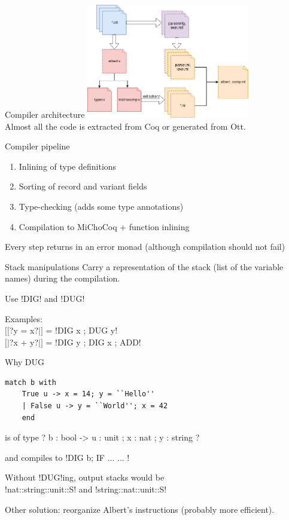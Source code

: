 \documentclass[aspectratio=169]{beamer}
\begin{document}
\begin{frame}{Compiler architecture}
  \centering
  \includegraphics[height=5cm]{ressources/albert_comp.png}\\
  Almost all the code is extracted from Coq or generated from Ott.
\end{frame}

\begin{frame}{Compiler pipeline}
  \begin{enumerate}
  \item Inlining of type definitions
  \item Sorting of record and variant fields
  \item Type-checking (adds some type annotations)
  \item Compilation to MiChoCoq + function inlining
  \end{enumerate}
  Every step returns in an error monad (although compilation should not fail)
\end{frame}

\begin{frame}[fragile]{Stack manipulations}
  Carry a representation of the stack (list of the variable names) during the compilation.

  Use !DIG! and !DUG!

  Examples:\\
  $[[$?y = x?$|]$ = !DIG x ; DUG y!\\
  $[|$?x + y?$|]$ = !DIG y ; DIG x ; ADD!\\
\end{frame} 

\begin{frame}[fragile]{Why DUG}
  \begin{lstlisting}[language=albert]
    match b with
    True u -> x = 14; y = ``Hello''
    | False u -> y = ``World''; x = 42
    end
  \end{lstlisting}
  is of type ?{ b : bool } -> { u : unit ; x : nat ; y : string }?

  and compiles to !DIG b; IF { ... } { ... }!

  Without !DUG!ing, output stacks would be\\
  !nat::string::unit::S! and !string::nat::unit::S!

  Other solution: reorganize Albert's instructions (probably more efficient).
\end{frame}
\end{document}
